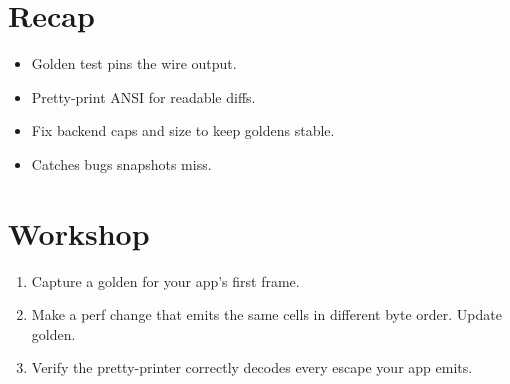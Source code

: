 \section{Recap}

\begin{recap}
\begin{itemize}[leftmargin=*]
  \item Golden test pins the wire output.
  \item Pretty-print ANSI for readable diffs.
  \item Fix backend caps and size to keep goldens stable.
  \item Catches bugs snapshots miss.
\end{itemize}
\end{recap}

\section*{Workshop}

\begin{enumerate}[leftmargin=*]
  \item Capture a golden for your app's first frame.
  \item Make a perf change that emits the same cells in
    different byte order. Update golden.
  \item Verify the pretty-printer correctly decodes every
    escape your app emits.
\end{enumerate}

